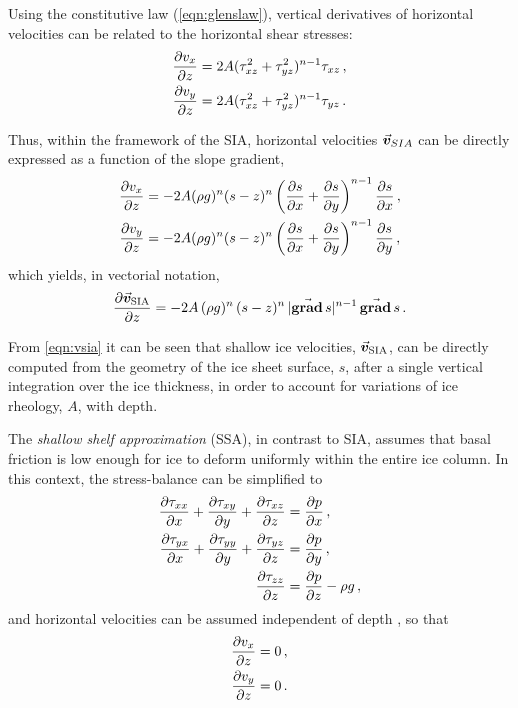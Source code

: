 \documentclass[a4paper]{kappa}
\newcommand{\vect}[1]{\va*{#1}} %
\renewcommand{\grad}[1]{\vect{\mathrm{grad}}\,#1}   %
\newcommand{\vv}[0]{\vect{v}}           %
\newcommand{\vsia}[0]{\vv_{\mathrm{SIA}}}   %
\begin{document}
Using the constitutive law (\ref{eqn:glenslaw}), vertical derivatives of
horizontal velocities can be related to the horizontal shear stresses:
\begin{subequations}
\begin{align}
    \pdv{v_x}{z} &= 2A (\tau_{xz}^2 + \tau_{yz}^2)^{n-1} \tau_{xz} \,, \\
    \pdv{v_y}{z} &= 2A (\tau_{xz}^2 + \tau_{yz}^2)^{n-1} \tau_{yz} \,.
\end{align}
\end{subequations}

Thus, within the framework of the SIA, horizontal velocities $\vv_{SIA}$ can be
directly expressed as a function of the slope gradient,
\begin{subequations}
\begin{align}
    \pdv{v_x}{z} &= -2A (\rho g)^n (s-z)^n
                    \left(\pdv{s}{x}+\pdv{s}{y}\right)^{n-1} \pdv{s}{x} \,, \\
    \pdv{v_y}{z} &= -2A (\rho g)^n (s-z)^n
                    \left(\pdv{s}{x}+\pdv{s}{y}\right)^{n-1} \pdv{s}{y} \,,
\end{align}
\end{subequations}
which yields, in vectorial notation,
\begin{equation}
    \label{eqn:vsia}
    \pdv{\vsia}{z} = -2A\,(\rho g)^n\,(s-z)^n\,|\grad{s}|^{n-1}\,\grad{s} \,.
\end{equation}

From \cref{eqn:vsia} it can be seen that shallow ice velocities, $\vsia$,
can be directly computed from the geometry of the ice sheet surface, $s$,
after a single vertical integration over the ice thickness, in order to
account for variations of ice rheology, $A$, with depth.

The \emph{shallow shelf approximation} (SSA), in contrast to SIA, assumes that
basal friction is low enough for ice to deform uniformly within the entire ice
column. In this context, the stress-balance can
be simplified to \citep[Eqs.~4.10--4.12]{Weis.etal.1999}
\begin{subequations}
\label{eqn:ssa}
\begin{align}
    \label{eqn:ssax}
    \pdv{\tau_{xx}}{x} + \pdv{\tau_{xy}}{y} + \pdv{\tau_{xz}}{z}
        &= \pdv{p}{x} \,, \\
    \label{eqn:ssay}
    \pdv{\tau_{yx}}{x} + \pdv{\tau_{yy}}{y} + \pdv{\tau_{yz}}{z}
        &= \pdv{p}{y} \,, \\
    \label{eqn:ssaz}
    \pdv{\tau_{zz}}{z} &= \pdv{p}{z} - \rho g \,,
\end{align}
\end{subequations}
and horizontal velocities can be assumed independent of depth
\citep[Eq.~4.22]{Weis.etal.1999}, so that
\begin{align}
    \pdv{v_x}{z} &= 0 \,, \\
    \pdv{v_y}{z} &= 0 \,.
\end{align}
\end{document}
